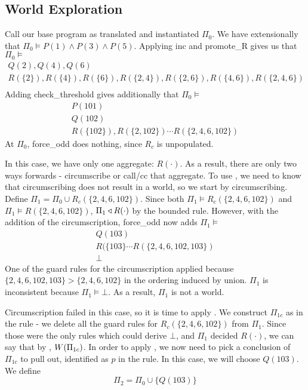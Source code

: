 \subsection{World Exploration}
Call our base program as translated and instantiated $\Pi_0$.
We have extensionally that $\Pi_0 \models P(1) \wedge P(3) \wedge P(5)$.
Applying inc and promote\_R gives us that $\Pi_0 \models$
\begin{align*}
	Q(2), Q(4), Q(6)\\
	R(\{2\}), R(\{4\}), R(\{6\}), R(\{2, 4\}), R(\{2, 6\}), R(\{4, 6\}), R(\{2, 4, 6\})\\
\end{align*}
Adding check\_threshold gives additionally that $\Pi_0 \models$
\begin{align*}
	P(101)\\
	Q(102)\\
	R(\{102\}), R(\{2, 102\}) \cdots R(\{2, 4, 6, 102\})
\end{align*}
At $\Pi_0$, force\_odd does nothing, since $R_c$ is unpopulated.

In this case, we have only one aggregate: $R(\cdot)$.
As a result, there are only two ways forwards - circumscribe or call/cc that aggregate.
To use , we need to know that circumscribing does not result in a world, so we start by circumscribing.
Define $\Pi_1 = \Pi_0 \cup R_c(\{2, 4, 6, 102\})$.
Since both $\Pi_1 \models R_c(\{2, 4, 6, 102\})$ and $\Pi_1 \models R(\{2, 4, 6, 102\})$, $\Pi_1 \triangleleft R(\cdot)$ by the bounded rule.
However, with the addition of the circumscription, force\_odd now adds $\Pi_1 \models$
\begin{align*}
	Q(103)\\
	R(\{103\} \cdots R(\{2, 4, 6, 102, 103\})\\
	\bot
\end{align*}
One of the guard rules for the circumscription applied because $\{2, 4, 6, 102, 103\} > \{2, 4, 6, 102\}$ in the ordering induced by union.
$\Pi_1$ is inconsistent because $\Pi_1 \models \bot$.
As a result, $\Pi_1$ is not a world.

Circumscription failed in this case, so it is time to apply .
We construct $\Pi_{1c}$ as in the rule - we delete all the guard rules for $R_c(\{2, 4, 6, 102\})$ from $\Pi_1$.
Since those were the only rules which could derive $\bot$, and $\Pi_1$ decided $R(\cdot)$, we can say that by , $W({\Pi_{1c}})$.
In order to apply , we now need to pick a conclusion of $\Pi_{1c}$ to pull out, identified as $p$ in the rule.
In this case, we will choose $Q(103)$.
We define
\[
	\Pi_2 = \Pi_0 \cup \{Q(103)\}
\]

